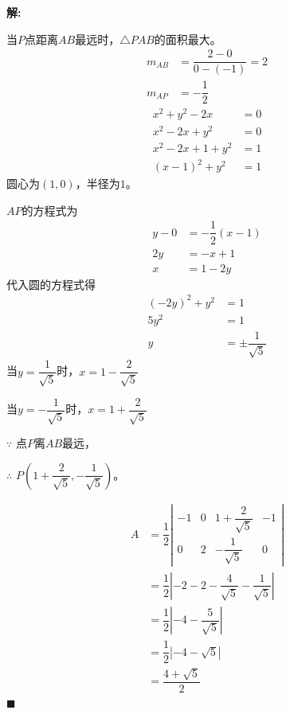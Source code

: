 \documentclass[10pt]{article}
\newcommand{\sol}{\textbf{解:} }
\begin{document}
\begin{enumerate}[leftmargin=*]
        \sol{}

        当$P$点距离$AB$最远时，$\triangle PAB$的面积最大。
        \begin{align*}
          m_{AB} & = \dfrac{2-0}{0-(-1)} = 2 \\
          m_{AP} & = -\dfrac{1}{2}
        \end{align*}
        \begin{align*}
          x^{2} + y^{2} - 2x     & = 0 \\
          x^{2} - 2x + y^{2}     & = 0 \\
          x^{2} - 2x + 1 + y^{2} & = 1 \\
          (x-1)^{2} + y^{2}      & = 1
        \end{align*}
        圆心为$(1, 0)$，半径为$1$。

        $AP$的方程式为
        \begin{align*}
          y - 0 & = -\dfrac{1}{2}(x - 1) \\
          2y    & = -x + 1               \\
          x     & = 1 - 2y
        \end{align*}
        代入圆的方程式得
        \begin{align*}
          (-2y)^{2} + y^{2} & = 1                       \\
          5y^{2}            & = 1                       \\
          y                 & = \pm \dfrac{1}{\sqrt{5}}
        \end{align*}
        当$y = \dfrac{1}{\sqrt{5}}$时，$x = 1 - \dfrac{2}{\sqrt{5}}$

        当$y = -\dfrac{1}{\sqrt{5}}$时，$x = 1 + \dfrac{2}{\sqrt{5}}$

        $\because$ 点$P$离$AB$最远，

        $\therefore$ $P\left(1 + \dfrac{2}{\sqrt{5}}, -\dfrac{1}{\sqrt{5}}\right)$。

        \begin{align*}
          A & = \dfrac{1}{2}\left\vert\begin{matrix}
                                        -1 & 0 & 1 + \dfrac{2}{\sqrt{5}} & -1 \\
                                        0  & 2 & -\dfrac{1}{\sqrt{5}}    & 0
                                      \end{matrix}
          \right\vert                                                                               \\
            & = \dfrac{1}{2}\left\vert-2 - 2 - \dfrac{4}{\sqrt{5}} - \dfrac{1}{\sqrt{5}}\right\vert \\
            & = \dfrac{1}{2}\left\vert-4 - \dfrac{5}{\sqrt{5}}\right\vert                           \\
            & = \dfrac{1}{2}\left\vert-4 - \sqrt{5}\right\vert                                      \\
            & = \dfrac{4 + \sqrt{5}}{2}
        \end{align*} \hfill$\blacksquare$


\end{enumerate}
\end{document}
